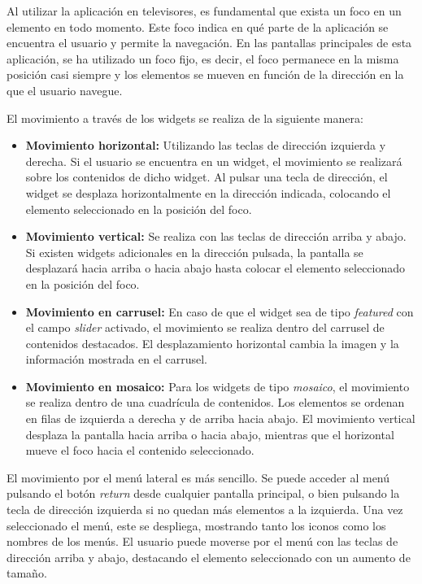 Al utilizar la aplicación en televisores, es fundamental que exista un foco en un elemento en todo momento. Este foco indica en qué parte de la aplicación 
se encuentra el usuario y permite la navegación. En las pantallas principales de esta aplicación, se ha utilizado un foco fijo, es decir, el foco permanece 
en la misma posición casi siempre y los elementos se mueven en función de la dirección en la que el usuario navegue.

El movimiento a través de los widgets se realiza de la siguiente manera:

\begin{itemize}
    \item \textbf{Movimiento horizontal:} Utilizando las teclas de dirección izquierda y derecha. Si el usuario se encuentra en un widget, el movimiento 
    se realizará sobre los contenidos de dicho widget. Al pulsar una tecla de dirección, el widget se desplaza horizontalmente en la dirección indicada, 
    colocando el elemento seleccionado en la posición del foco.
    
    \item \textbf{Movimiento vertical:} Se realiza con las teclas de dirección arriba y abajo. Si existen widgets adicionales en la dirección pulsada, 
    la pantalla se desplazará hacia arriba o hacia abajo hasta colocar el elemento seleccionado en la posición del foco.
    
    \item \textbf{Movimiento en carrusel:} En caso de que el widget sea de tipo \textit{featured} con el campo \textit{slider} activado, el movimiento 
    se realiza dentro del carrusel de contenidos destacados. El desplazamiento horizontal cambia la imagen y la información mostrada en el carrusel.
    
    \item \textbf{Movimiento en mosaico:} Para los widgets de tipo \textit{mosaico}, el movimiento se realiza dentro de una cuadrícula de contenidos. 
    Los elementos se ordenan en filas de izquierda a derecha y de arriba hacia abajo. El movimiento vertical desplaza la pantalla hacia arriba o hacia abajo, 
    mientras que el horizontal mueve el foco hacia el contenido seleccionado.
\end{itemize}

El movimiento por el menú lateral es más sencillo. Se puede acceder al menú pulsando el botón \textit{return} desde cualquier pantalla principal, 
o bien pulsando la tecla de dirección izquierda si no quedan más elementos a la izquierda. Una vez seleccionado el menú, este se despliega, mostrando 
tanto los iconos como los nombres de los menús. El usuario puede moverse por el menú con las teclas de dirección arriba y abajo, destacando el 
elemento seleccionado con un aumento de tamaño.


